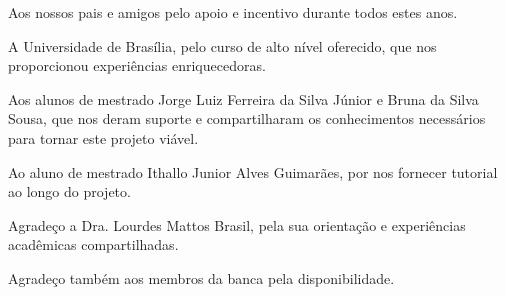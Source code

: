 \begin{agradecimentos}
Aos nossos pais e amigos pelo apoio e incentivo durante todos estes anos.

A Universidade de Brasília, pelo curso de alto nível oferecido, que nos proporcionou experiências enriquecedoras.

Aos alunos de mestrado Jorge Luiz Ferreira da Silva Júnior e Bruna da Silva Sousa, que nos deram suporte e compartilharam os conhecimentos necessários para tornar este projeto viável.

Ao aluno de mestrado Ithallo Junior Alves Guimarães, por nos fornecer tutorial ao longo do projeto.

Agradeço a Dra. Lourdes Mattos Brasil, pela sua orientação e experiências acadêmicas compartilhadas.

Agradeço também aos membros da banca pela disponibilidade.    

\end{agradecimentos}
